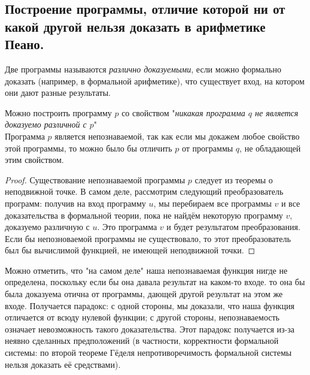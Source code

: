 \subsection{Построение программы, отличие которой ни от какой другой нельзя доказать в арифметике Пеано.}

\begin{definition}
    Две программы называются \textit{различно доказуемыми}, если можно формально доказать (например, в формальной арифметике), что существует вход, на котором они дают разные результаты.
\end{definition}

\begin{theorem}
    Можно построить программу $p$ со свойством "\textit{никакая программа $q$ не является доказуемо различной с $p$}"\\
    Программа $p$ является непознаваемой, так как если мы докажем любое свойство этой программы, то можно было бы отличить $p$ от программы $q$, не обладающей этим свойством.\\
    
    \begin{proof}
        Существование непознаваемой программы $p$ следует из теоремы о неподвижной точке. В самом деле, рассмотрим следующий преобразователь программ: получив на вход программу $u$, мы перебираем все программы $v$ и все доказательства в формальной теории, пока не найдём некоторую программу $v$, доказуемо различную с $u$. Это программа $v$ и будет результатом преобразования. Если бы непозноваемой программы не существовало, то этот преобразователь был бы вычислимой функцией, не имеющей неподвижной точки.
    \end{proof}
    
    Можно отметить, что "на самом деле" наша непознаваемая функция нигде не определена, поскольку если бы она давала результат на каком-то входе. то она бы была доказуема отична от программы, дающей другой результат на этом же входе. Получается парадокс: с одной стороны, мы доказали, что наша функция отличается от всюду нулевой функции;  с другой стороны, непознаваемость означает невозможность такого доказательства. Этот парадокс получается из-за неявно сделанных предположений (в частности, корректности формальной системы: по второй теореме Гёделя непротиворечимость формальной системы нельзя доказать её средствами).
    
\end{theorem}

    